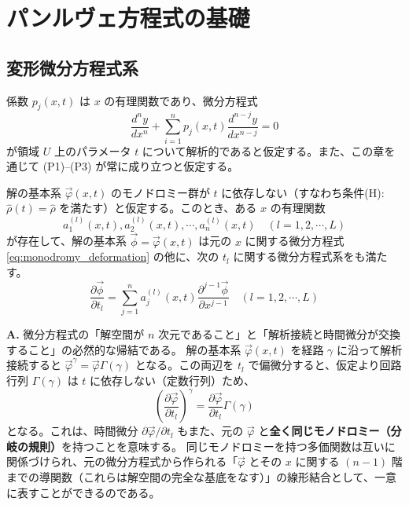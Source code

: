 
\section{パンルヴェ方程式の基礎}

\subsection{変形微分方程式系}

係数 $p_{j}(x,t)$ は $x$ の有理関数であり、微分方程式 
\begin{equation}\label{eq:3.1_n-ODE}
\frac{d^{n}y}{dx^{n}}+\sum_{i=1}^{n}p_{j}(x,t)\frac{d^{n-j}y}{dx^{n-j}}=0
\end{equation}
が領域 $U$ 上のパラメータ $t$ について解析的であると仮定する。また、この章を通じて (P1)--(P3) が常に成り立つと仮定する。

\begin{proposition}\label{prop:3.1_time_evolution_equation}
解の基本系 $\vec{\varphi}(x,t)$ のモノドロミー群が $t$ に依存しない（すなわち条件(H): $\hat{\rho}(t) = \hat{\rho}$ を満たす）と仮定する。このとき、ある $x$ の有理関数
\[
a_{1}^{(l)}(x,t), a_{2}^{(l)}(x,t), \cdots, a_{n}^{(l)}(x,t) \quad (l=1,2,\cdots,L)
\]
が存在して、解の基本系 $\vec{\phi} = \vec{\varphi}(x,t)$ は元の $x$ に関する微分方程式 \eqref{eq:monodromy_deformation} の他に、次の $t_l$ に関する微分方程式系をも満たす。
\begin{equation}\label{eq:3.1_partial_t}
\frac{\partial \vec{\phi}}{\partial t_{l}} = \sum_{j=1}^{n}a_{j}^{(l)}(x,t)\frac{\partial^{j-1}\vec{\phi}}{\partial x^{j-1}} \quad (l=1,2,\cdots,L)
\end{equation}
\end{proposition}

\begin{Q}
\textbf{A.} 微分方程式の「解空間が $n$ 次元であること」と「解析接続と時間微分が交換すること」の必然的な帰結である。
解の基本系 $\vec{\varphi}(x,t)$ を経路 $\gamma$ に沿って解析接続すると $\vec{\varphi}^\gamma = \vec{\varphi} \Gamma(\gamma)$ となる。この両辺を $t_l$ で偏微分すると、仮定より回路行列 $\Gamma(\gamma)$ は $t$ に依存しない（定数行列）ため、
\[
\left(\frac{\partial \vec{\varphi}}{\partial t_l}\right)^\gamma = \frac{\partial \vec{\varphi}}{\partial t_l} \Gamma(\gamma)
\]
となる。これは、時間微分 $\partial \vec{\varphi} / \partial t_l$ もまた、元の $\vec{\varphi}$ と\textbf{全く同じモノドロミー（分岐の規則）}を持つことを意味する。
同じモノドロミーを持つ多価関数は互いに関係づけられ、元の微分方程式から作られる「$\vec{\varphi}$ とその $x$ に関する $(n-1)$ 階までの導関数（これらは解空間の完全な基底をなす）」の線形結合として、一意に表すことができるのである。
\end{Q}

